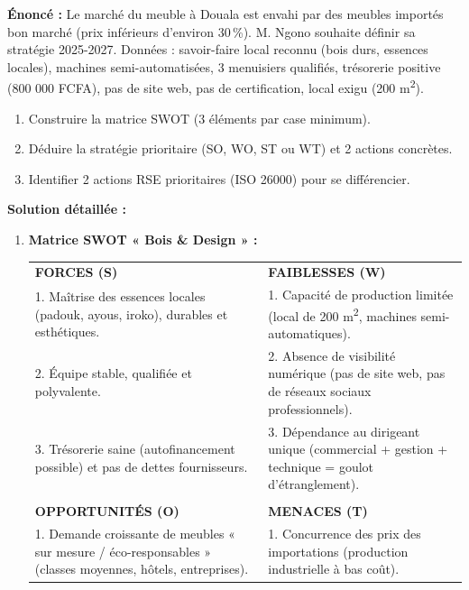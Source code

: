 \documentclass[11pt]{article}
\begin{document}
\begin{exoresolu}
    \textbf{Énoncé :} Le marché du meuble à Douala est envahi par des meubles importés bon marché (prix inférieurs d'environ 30\,\%). M. Ngono souhaite définir sa stratégie 2025-2027. Données : savoir-faire local reconnu (bois durs, essences locales), machines semi-automatisées, 3 menuisiers qualifiés, trésorerie positive (800 000 FCFA), pas de site web, pas de certification, local exigu (200 m\textsuperscript{2}).
    \begin{enumerate}
        \item Construire la matrice SWOT (3 éléments par case minimum).
        \item Déduire la stratégie prioritaire (SO, WO, ST ou WT) et 2 actions concrètes.
        \item Identifier 2 actions RSE prioritaires (ISO 26000) pour se différencier.
    \end{enumerate}
    \tcblower
    \textbf{Solution détaillée :}
    \begin{enumerate}
        \item \textbf{Matrice SWOT « Bois \& Design » :}
              \begin{center}
              \begin{tabularx}{\linewidth}{|X|X|}\hline
              \rowcolor{popgreenL} \multicolumn{2}{|c|}{\textbf{ANALYSE INTERNE}} \\ \hline
              \textbf{FORCES (S)} & \textbf{FAIBLESSES (W)} \\ \hline
              1. Maîtrise des essences locales (padouk, ayous, iroko), durables et esthétiques. & 1. Capacité de production limitée (local de 200 m\textsuperscript{2}, machines semi-automatiques). \\
              2. Équipe stable, qualifiée et polyvalente. & 2. Absence de visibilité numérique (pas de site web, pas de réseaux sociaux professionnels). \\
              3. Trésorerie saine (autofinancement possible) et pas de dettes fournisseurs. & 3. Dépendance au dirigeant unique (commercial + gestion + technique = goulot d'étranglement). \\ \hline
              \rowcolor{poporangeL} \multicolumn{2}{|c|}{\textbf{ANALYSE EXTERNE}} \\ \hline
              \textbf{OPPORTUNITÉS (O)} & \textbf{MENACES (T)} \\ \hline
              1. Demande croissante de meubles « sur mesure / éco-responsables » (classes moyennes, hôtels, entreprises). & 1. Concurrence des prix des importations (production industrielle à bas coût). \\

\end{tabularx}
\end{center}
\end{enumerate}
\end{exoresolu}
\end{document}
